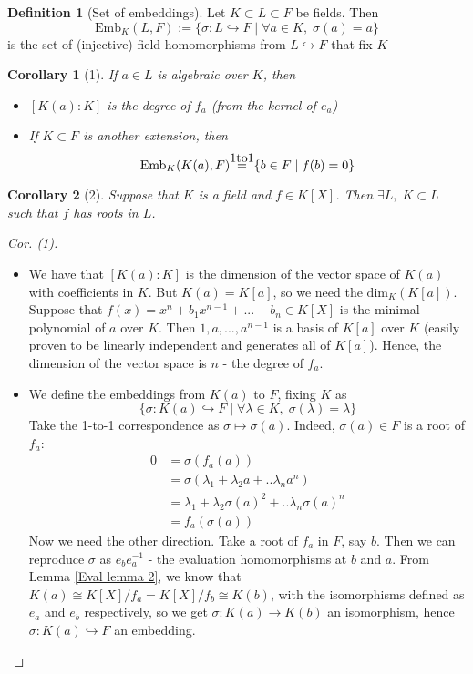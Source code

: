 \documentclass{article}
\theoremstyle{definition}
\newtheorem{defn}{Definition}[section]
\theoremstyle{plain}%
\newtheorem*{cor}{Corollary}
\theoremstyle{remark}
\newcommand{\onetoone}{\stackrel{\mathclap{\normalfont\mbox{1to1}}}{\;=\;}}
\begin{document}
\begin{defn}[Set of embeddings]
Let $K \subset L \subset F$ be fields. Then
\[\text{Emb}_K (L, F) := \{\sigma: L \hookrightarrow F \; | \; \forall a \in K, \;\sigma(a) = a\}\] 
is the set of (injective) field homomorphisms from $L \hookrightarrow F$ that fix $K$
\end{defn}

\begin{cor}[1]
If $a \in L$ is algebraic over $K$, then
\begin{itemize}
    \item $[K(a) : K]$ is the degree of $f_a$ (from the kernel of $e_a$)
    \item If $K \subset F$ is another extension, then 
    \[\text{Emb}_{K}(K(a), F) \onetoone \{b \in F \; | \; f(b) = 0\}\]
\end{itemize}
\end{cor}

\begin{cor}[2]
Suppose that $K$ is a field and $f \in K[X]$. Then $\exists L, \; K \subset L$ such that $f$ has roots in $L$.
\end{cor}

\begin{proof}[Cor. (1)]
\hspace{0.1em}
\begin{itemize}
    \item We have that $[K(a) : K]$ is the dimension of the vector space of $K(a)$ with coefficients in $K$. But $K(a) = K[a]$, so we need the $\text{dim}_{K}(K[a])$. Suppose that $f(x) = x^n + b_1x^{n-1} + ... + b_n \in K[X]$ is the minimal polynomial of $a$ over $K$. Then $1, a, ..., a^{n-1}$ is a basis of $K[a]$ over $K$ (easily proven to be linearly independent and generates all of $K[a]$). Hence, the dimension of the vector space is $n$ - the degree of $f_a$.
    \item We define the embeddings from $K(a)$ to $F$, fixing $K$ as \[\{\sigma : K(a) \hookrightarrow F \; | \; \forall \lambda \in K, \; \sigma(\lambda) = \lambda\}\]
    Take the 1-to-1 correspondence as $\sigma \mapsto \sigma(a)$. Indeed, $\sigma(a) \in F$ is a root of $f_a$:
    \begin{align*}
        0 &= \sigma(f_a(a)) \\
          &= \sigma(\lambda_1 + \lambda_2a + .. \lambda_na^n) \\
          &= \lambda_1 + \lambda_2\sigma(a)^2 + .. \lambda_n\sigma(a)^n \\
          &= f_a(\sigma(a))
    \end{align*}
    Now we need the other direction. Take a root of $f_a$ in $F$, say $b$. Then we can reproduce $\sigma$ as $e_be_a^{-1}$ - the evaluation homomorphisms at $b$ and $a$. From Lemma \ref{Eval lemma 2}, we know that $K(a) \cong K[X]/f_a = K[X]/f_b \cong K(b)$, with the isomorphisms defined as $e_a$ and $e_b$ respectively, so we get $\sigma : K(a) \to K(b)$ an isomorphism, hence $\sigma : K(a) \hookrightarrow F$ an embedding.
\end{itemize}

\end{proof}
\end{document}
